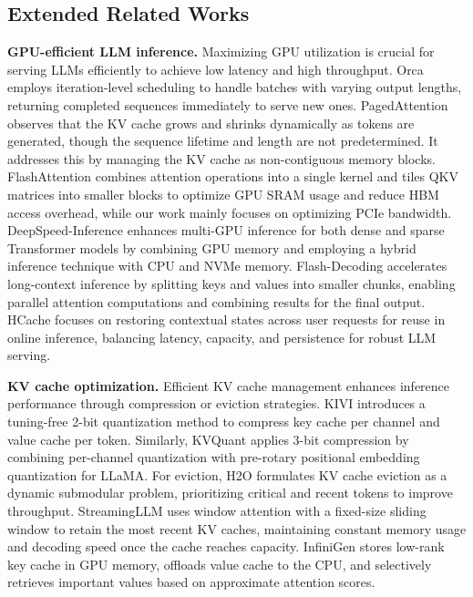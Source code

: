\documentclass[11pt]{article}
\begin{document}
\subsection{Extended Related Works}
\textbf{GPU-efficient LLM inference.} 
Maximizing GPU utilization is crucial for serving LLMs efficiently to achieve low latency and high throughput.
Orca \cite{yu2022orca} employs iteration-level scheduling to handle batches with varying output lengths, returning completed sequences immediately to serve new ones. 
PagedAttention \cite{kwon2023vllm} observes that the KV cache grows and shrinks dynamically as tokens are generated, though the sequence lifetime and length are not predetermined. It addresses this by managing the KV cache as non-contiguous memory blocks. FlashAttention \cite{dao2022flashattention} combines attention operations into a single kernel and tiles QKV matrices into smaller blocks to optimize GPU SRAM usage and reduce HBM access overhead, while our work mainly focuses on optimizing PCIe bandwidth. DeepSpeed-Inference \cite{aminabadi2022deepspeed} enhances multi-GPU inference for both dense and sparse Transformer models by combining GPU memory and employing a hybrid inference technique with CPU and NVMe memory. Flash-Decoding \cite{flashdecoding2023} accelerates long-context inference by splitting keys and values into smaller chunks, enabling parallel attention computations and combining results for the final output. HCache \cite{gao2025fast} focuses on restoring contextual states across user requests for reuse in online inference, balancing latency, capacity, and persistence for robust LLM serving.

\noindent \textbf{KV cache optimization.} 
Efficient KV cache management enhances inference performance through compression or eviction strategies. KIVI \cite{liu2024kivi} introduces a tuning-free 2-bit quantization method to compress key cache per channel and value cache per token. Similarly, KVQuant \cite{hooper2024kvquant} applies 3-bit compression by combining per-channel quantization with pre-rotary positional embedding quantization for LLaMA. For eviction, H2O \cite{zhang2023h2o} formulates KV cache eviction as a dynamic submodular problem, prioritizing critical and recent tokens to improve throughput. StreamingLLM \cite{xiao2023efficient} uses window attention with a fixed-size sliding window to retain the most recent KV caches, maintaining constant memory usage and decoding speed once the cache reaches capacity. InfiniGen \cite{lee2024infinigen} stores low-rank key cache in GPU memory, offloads value cache to the CPU, and selectively retrieves important values based on approximate attention scores.
\end{document}
